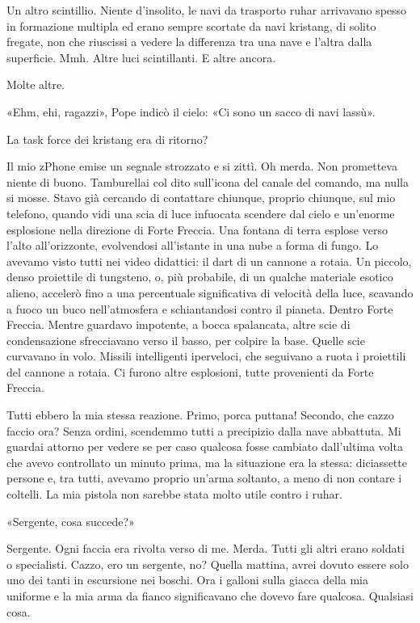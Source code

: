 Un altro scintillio. Niente d'insolito, le navi da trasporto ruhar
arrivavano spesso in formazione multipla ed erano sempre scortate da
navi kristang, di solito fregate, non che riuscissi a vedere la
differenza tra una nave e l'altra dalla superficie. Mmh. Altre luci
scintillanti. E altre ancora.

Molte altre.

«Ehm, ehi, ragazzi», Pope indicò il cielo: «Ci sono un sacco di navi
lassù».

La task force dei kristang era di ritorno?

Il mio zPhone emise un segnale strozzato e si zittì. Oh merda. Non
prometteva niente di buono. Tamburellai col dito sull'icona del canale
del comando, ma nulla si mosse. Stavo già cercando di contattare
chiunque, proprio chiunque, sul mio telefono, quando vidi una scia di
luce infuocata scendere dal cielo e un'enorme esplosione nella direzione
di Forte Freccia. Una fontana di terra esplose verso l'alto
all'orizzonte, evolvendosi all'istante in una nube a forma di fungo. Lo
avevamo visto tutti nei video didattici: il dart di un cannone a rotaia.
Un piccolo, denso proiettile di tungsteno, o, più probabile, di un
qualche materiale esotico alieno, accelerò fino a una percentuale
significativa di velocità della luce, scavando a fuoco un buco
nell'atmosfera e schiantandosi contro il pianeta. Dentro Forte Freccia.
Mentre guardavo impotente, a bocca spalancata, altre scie di
condensazione sfrecciavano verso il basso, per colpire la base. Quelle
scie curvavano in volo. Missili intelligenti iperveloci, che seguivano a
ruota i proiettili del cannone a rotaia. Ci furono altre esplosioni,
tutte provenienti da Forte Freccia.

Tutti ebbero la mia stessa reazione. Primo, porca puttana! Secondo, che
cazzo faccio ora? Senza ordini, scendemmo tutti a precipizio dalla nave
abbattuta. Mi guardai attorno per vedere se per caso qualcosa fosse
cambiato dall'ultima volta che avevo controllato un minuto prima, ma la
situazione era la stessa: diciassette persone e, tra tutti, avevamo
proprio un'arma soltanto, a meno di non contare i coltelli. La mia
pistola non sarebbe stata molto utile contro i ruhar.

«Sergente, cosa succede?»

Sergente. Ogni faccia era rivolta verso di me. Merda. Tutti gli altri
erano soldati o specialisti. Cazzo, ero un sergente, no? Quella mattina,
avrei dovuto essere solo uno dei tanti in escursione nei boschi. Ora i
galloni sulla giacca della mia uniforme e la mia arma da fianco
significavano che dovevo fare qualcosa. Qualsiasi cosa.

